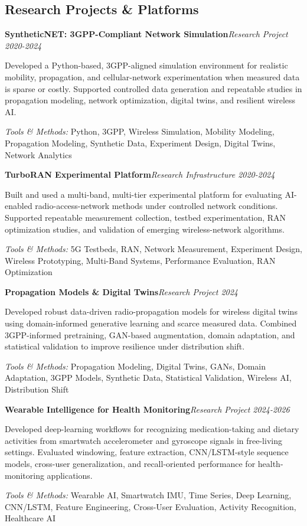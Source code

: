 \documentclass[9pt,letterpaper]{extarticle}
\newcommand{\entry}[2]{\Needspace{4\baselineskip}\textbf{#1}\hfill\textit{#2}\par}
\begin{document}
\subsection{Research Projects \& Platforms}
\entry{SyntheticNET: 3GPP-Compliant Network Simulation}{Research Project \textbar{} 2020-2024}
Developed a Python-based, 3GPP-aligned simulation environment for realistic mobility, propagation, and cellular-network experimentation when measured data is sparse or costly. Supported controlled data generation and repeatable studies in propagation modeling, network optimization, digital twins, and resilient wireless AI.\par
{\small\textit{Tools \& Methods:} Python, 3GPP, Wireless Simulation, Mobility Modeling, Propagation Modeling, Synthetic Data, Experiment Design, Digital Twins, Network Analytics\par}
\vspace{1pt}
\entry{TurboRAN Experimental Platform}{Research Infrastructure \textbar{} 2020-2024}
Built and used a multi-band, multi-tier experimental platform for evaluating AI-enabled radio-access-network methods under controlled network conditions. Supported repeatable measurement collection, testbed experimentation, RAN optimization studies, and validation of emerging wireless-network algorithms.\par
{\small\textit{Tools \& Methods:} 5G Testbeds, RAN, Network Measurement, Experiment Design, Wireless Prototyping, Multi-Band Systems, Performance Evaluation, RAN Optimization\par}
\vspace{1pt}
\entry{Propagation Models \& Digital Twins}{Research Project \textbar{} 2024}
Developed robust data-driven radio-propagation models for wireless digital twins using domain-informed generative learning and scarce measured data. Combined 3GPP-informed pretraining, GAN-based augmentation, domain adaptation, and statistical validation to improve resilience under distribution shift.\par
{\small\textit{Tools \& Methods:} Propagation Modeling, Digital Twins, GANs, Domain Adaptation, 3GPP Models, Synthetic Data, Statistical Validation, Wireless AI, Distribution Shift\par}
\vspace{1pt}
\entry{Wearable Intelligence for Health Monitoring}{Research Project \textbar{} 2024-2026}
Developed deep-learning workflows for recognizing medication-taking and dietary activities from smartwatch accelerometer and gyroscope signals in free-living settings. Evaluated windowing, feature extraction, CNN/LSTM-style sequence models, cross-user generalization, and recall-oriented performance for health-monitoring applications.\par
{\small\textit{Tools \& Methods:} Wearable AI, Smartwatch IMU, Time Series, Deep Learning, CNN/LSTM, Feature Engineering, Cross-User Evaluation, Activity Recognition, Healthcare AI\par}
\vspace{1pt}
\end{document}
